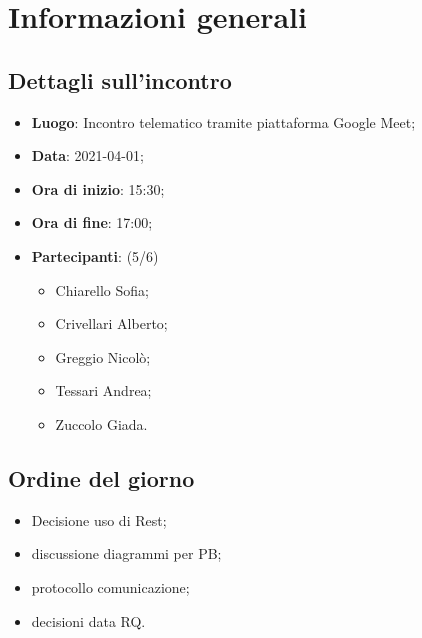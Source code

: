 \section{Informazioni generali}

\subsection{Dettagli sull'incontro}
\begin{itemize}
\item \textbf{Luogo}: Incontro telematico tramite piattaforma Google Meet;
\item \textbf{Data}: 2021-04-01;
\item \textbf{Ora di inizio}: 15:30;
\item \textbf{Ora di fine}: 17:00;
\item \textbf{Partecipanti}: (5/6) 
\begin{itemize}
	\item Chiarello Sofia;
	\item Crivellari Alberto;
	\item Greggio Nicolò;
	\item Tessari Andrea;
	\item Zuccolo Giada.
\end{itemize}
\end{itemize}

\subsection{Ordine del giorno}
\begin{itemize}
	\item Decisione uso di Rest;
	\item discussione diagrammi per PB;
	\item protocollo comunicazione;
	\item decisioni data RQ.
\end{itemize}



